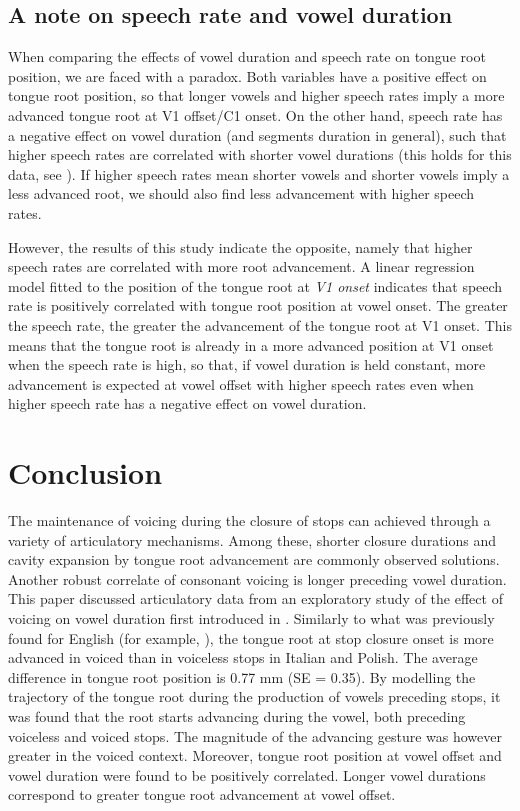 \documentclass[preprint]{JASAnew}
\begin{document}
\hypertarget{a-note-on-speech-rate-and-vowel-duration}{%
\subsection{A note on speech rate and vowel
duration}\label{a-note-on-speech-rate-and-vowel-duration}}

When comparing the effects of vowel duration and speech rate on tongue
root position, we are faced with a paradox. Both variables have a
positive effect on tongue root position, so that longer vowels and
higher speech rates imply a more advanced tongue root at V1 offset/C1
onset. On the other hand, speech rate has a negative effect on vowel
duration (and segments duration in general), such that higher speech
rates are correlated with shorter vowel durations (this holds for this
data, see \citealt{coretta2019k}). If higher speech rates mean shorter
vowels and shorter vowels imply a less advanced root, we should also
find less advancement with higher speech rates.

However, the results of this study indicate the opposite, namely that
higher speech rates are correlated with more root advancement. A linear
regression model fitted to the position of the tongue root at \emph{V1
onset} indicates that speech rate is positively correlated with tongue
root position at vowel onset. The greater the speech rate, the greater
the advancement of the tongue root at V1 onset. This means that the
tongue root is already in a more advanced position at V1 onset when the
speech rate is high, so that, if vowel duration is held constant, more
advancement is expected at vowel offset with higher speech rates even
when higher speech rate has a negative effect on vowel duration.

\hypertarget{conclusion}{%
\section{Conclusion}\label{conclusion}}

The maintenance of voicing during the closure of stops can achieved
through a variety of articulatory mechanisms. Among these, shorter
closure durations \citep{davis1989} and cavity expansion by tongue root
advancement \citep{westbury1983} are commonly observed solutions.
Another robust correlate of consonant voicing is longer preceding vowel
duration. This paper discussed articulatory data from an exploratory
study of the effect of voicing on vowel duration first introduced in
\citet{coretta2019k}. Similarly to what was previously found for English
(for example, \citealt{westbury1983, ahn2018}), the tongue root at stop
closure onset is more advanced in voiced than in voiceless stops in
Italian and Polish. The average difference in tongue root position is
0.77 mm (SE = 0.35). By modelling the trajectory of the tongue root
during the production of vowels preceding stops, it was found that the
root starts advancing during the vowel, both preceding voiceless and
voiced stops. The magnitude of the advancing gesture was however greater
in the voiced context. Moreover, tongue root position at vowel offset
and vowel duration were found to be positively correlated. Longer vowel
durations correspond to greater tongue root advancement at vowel offset.
\end{document}
